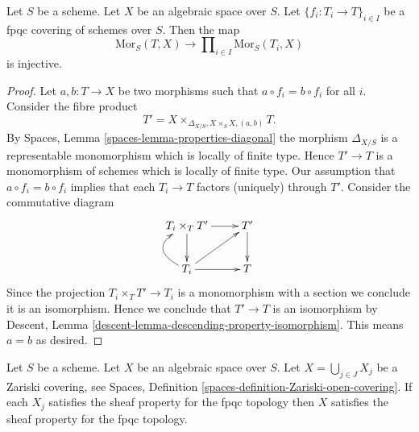 \begin{lemma}
\label{lemma-separated-fpqc}
Let $S$ be a scheme.
Let $X$ be an algebraic space over $S$.
Let $\{f_i : T_i \to T\}_{i \in I}$ be a fpqc covering of schemes over $S$.
Then the map
$$
\text{Mor}_S(T, X)
\longrightarrow
\prod\nolimits_{i \in I} \text{Mor}_S(T_i, X)
$$
is injective.
\end{lemma}

\begin{proof}
Let $a, b : T \to X$ be two morphisms such that $a \circ f_i = b \circ f_i$
for all $i$. Consider the fibre product
$$
T' = X \times_{\Delta_{X/S}, X \times_S X, (a, b)} T.
$$
By
Spaces, Lemma \ref{spaces-lemma-properties-diagonal}
the morphism $\Delta_{X/S}$ is a representable monomorphism which is
locally of finite type. Hence $T' \to T$ is a monomorphism of schemes which
is locally of finite type. Our assumption that $a \circ f_i = b \circ f_i$
implies that each $T_i \to T$ factors (uniquely) through $T'$. Consider
the commutative diagram
$$
\xymatrix{
T_i \times_T T' \ar[r] \ar[d] & T' \ar[d] \\
T_i \ar[r] \ar@/^5ex/[u] \ar[ru] & T
}
$$
Since the projection $T_i \times_T T' \to T_i$ is a monomorphism
with a section we conclude it is an isomorphism. Hence we conclude that
$T' \to T$ is an isomorphism by
Descent, Lemma \ref{descent-lemma-descending-property-isomorphism}.
This means $a = b$ as desired.
\end{proof}

\begin{lemma}
\label{lemma-sheaf-fpqc-open-covering}
Let $S$ be a scheme.
Let $X$ be an algebraic space over $S$.
Let $X = \bigcup_{j \in J} X_j$ be a Zariski covering, see
Spaces, Definition \ref{spaces-definition-Zariski-open-covering}.
If each $X_j$ satisfies the sheaf property for the fpqc topology
then $X$ satisfies the sheaf property for the fpqc topology.
\end{lemma}

